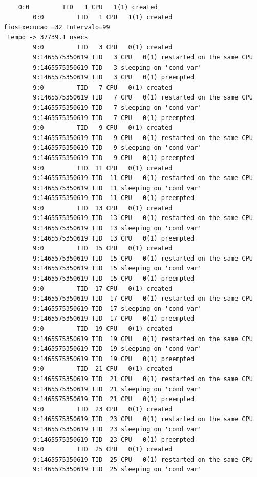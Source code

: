 \documentclass[conference,compsoc]{IEEEtran}
\begin{document}
\begin{lstlisting}
	0:0         TID   1 CPU   1(1) created
        0:0         TID   1 CPU   1(1) created
fiosExecucao =32 Intervalo=99
 tempo -> 37739.1 usecs
        9:0         TID   3 CPU   0(1) created
        9:1465575350619 TID   3 CPU   0(1) restarted on the same CPU
        9:1465575350619 TID   3 sleeping on 'cond var'
        9:1465575350619 TID   3 CPU   0(1) preempted
        9:0         TID   7 CPU   0(1) created
        9:1465575350619 TID   7 CPU   0(1) restarted on the same CPU
        9:1465575350619 TID   7 sleeping on 'cond var'
        9:1465575350619 TID   7 CPU   0(1) preempted
        9:0         TID   9 CPU   0(1) created
        9:1465575350619 TID   9 CPU   0(1) restarted on the same CPU
        9:1465575350619 TID   9 sleeping on 'cond var'
        9:1465575350619 TID   9 CPU   0(1) preempted
        9:0         TID  11 CPU   0(1) created
        9:1465575350619 TID  11 CPU   0(1) restarted on the same CPU
        9:1465575350619 TID  11 sleeping on 'cond var'
        9:1465575350619 TID  11 CPU   0(1) preempted
        9:0         TID  13 CPU   0(1) created
        9:1465575350619 TID  13 CPU   0(1) restarted on the same CPU
        9:1465575350619 TID  13 sleeping on 'cond var'
        9:1465575350619 TID  13 CPU   0(1) preempted
        9:0         TID  15 CPU   0(1) created
        9:1465575350619 TID  15 CPU   0(1) restarted on the same CPU
        9:1465575350619 TID  15 sleeping on 'cond var'
        9:1465575350619 TID  15 CPU   0(1) preempted
        9:0         TID  17 CPU   0(1) created
        9:1465575350619 TID  17 CPU   0(1) restarted on the same CPU
        9:1465575350619 TID  17 sleeping on 'cond var'
        9:1465575350619 TID  17 CPU   0(1) preempted
        9:0         TID  19 CPU   0(1) created
        9:1465575350619 TID  19 CPU   0(1) restarted on the same CPU
        9:1465575350619 TID  19 sleeping on 'cond var'
        9:1465575350619 TID  19 CPU   0(1) preempted
        9:0         TID  21 CPU   0(1) created
        9:1465575350619 TID  21 CPU   0(1) restarted on the same CPU
        9:1465575350619 TID  21 sleeping on 'cond var'
        9:1465575350619 TID  21 CPU   0(1) preempted
        9:0         TID  23 CPU   0(1) created
        9:1465575350619 TID  23 CPU   0(1) restarted on the same CPU
        9:1465575350619 TID  23 sleeping on 'cond var'
        9:1465575350619 TID  23 CPU   0(1) preempted
        9:0         TID  25 CPU   0(1) created
        9:1465575350619 TID  25 CPU   0(1) restarted on the same CPU
        9:1465575350619 TID  25 sleeping on 'cond var'

\end{lstlisting}
\end{document}
